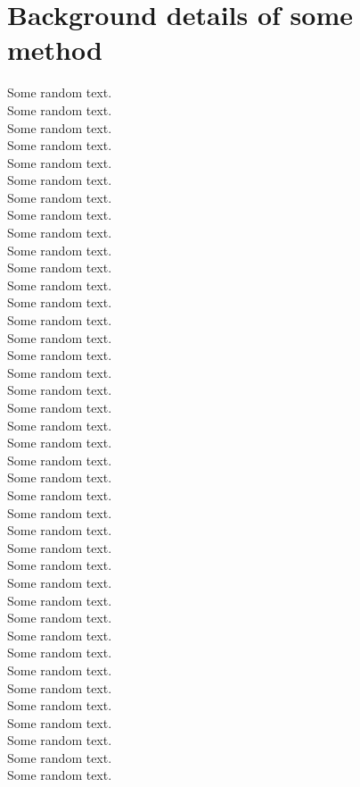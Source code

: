 \chapter{Background details of some method}


Some random text.\\
Some random text.\\
Some random text.\\
Some random text.\\
Some random text.\\
Some random text.\\
Some random text.\\
Some random text.\\
Some random text.\\
Some random text.\\
Some random text.\\
Some random text.\\
Some random text.\\
Some random text.\\
Some random text.\\
Some random text.\\
Some random text.\\
Some random text.\\
Some random text.\\
Some random text.\\
Some random text.\\
Some random text.\\
Some random text.\\
Some random text.\\
Some random text.\\
Some random text.\\
Some random text.\\
Some random text.\\
Some random text.\\
Some random text.\\
Some random text.\\
Some random text.\\
Some random text.\\
Some random text.\\
Some random text.\\
Some random text.\\
Some random text.\\
Some random text.\\
Some random text.\\
Some random text.\\
